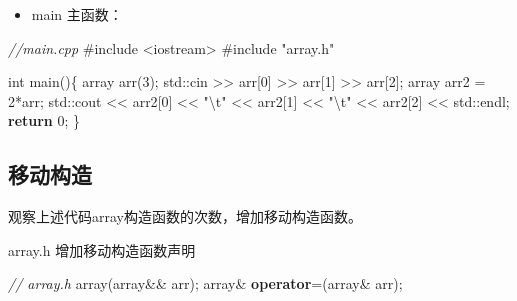 \documentclass[
]{article}
\newenvironment{Shaded}{}{}
\newcommand{\BuiltInTok}[1]{#1}
\newcommand{\CommentTok}[1]{\textcolor[rgb]{0.38,0.63,0.69}{\textit{#1}}}
\newcommand{\ControlFlowTok}[1]{\textcolor[rgb]{0.00,0.44,0.13}{\textbf{#1}}}
\newcommand{\DataTypeTok}[1]{\textcolor[rgb]{0.56,0.13,0.00}{#1}}
\newcommand{\DecValTok}[1]{\textcolor[rgb]{0.25,0.63,0.44}{#1}}
\newcommand{\ImportTok}[1]{#1}
\newcommand{\KeywordTok}[1]{\textcolor[rgb]{0.00,0.44,0.13}{\textbf{#1}}}
\newcommand{\NormalTok}[1]{#1}
\newcommand{\OperatorTok}[1]{\textcolor[rgb]{0.40,0.40,0.40}{#1}}
\newcommand{\PreprocessorTok}[1]{\textcolor[rgb]{0.74,0.48,0.00}{#1}}
\newcommand{\SpecialCharTok}[1]{\textcolor[rgb]{0.25,0.44,0.63}{#1}}
\newcommand{\StringTok}[1]{\textcolor[rgb]{0.25,0.44,0.63}{#1}}
\providecommand{\tightlist}{%
  \setlength{\itemsep}{0pt}\setlength{\parskip}{0pt}}
\begin{document}
\begin{itemize}
\tightlist
\item
  main 主函数：
\end{itemize}

\begin{Shaded}
\begin{Highlighting}[]
\CommentTok{//main.cpp}
\PreprocessorTok{\#include }\ImportTok{\textless{}iostream\textgreater{}}
\PreprocessorTok{\#include }\ImportTok{"array.h"}

\DataTypeTok{int}\NormalTok{ main}\OperatorTok{()\{}
\NormalTok{    array   arr}\OperatorTok{(}\DecValTok{3}\OperatorTok{);}
    \BuiltInTok{std::}\NormalTok{cin}\OperatorTok{ \textgreater{}\textgreater{}}\NormalTok{ arr}\OperatorTok{[}\DecValTok{0}\OperatorTok{]} \OperatorTok{\textgreater{}\textgreater{}}\NormalTok{ arr}\OperatorTok{[}\DecValTok{1}\OperatorTok{]} \OperatorTok{\textgreater{}\textgreater{}}\NormalTok{ arr}\OperatorTok{[}\DecValTok{2}\OperatorTok{];}
\NormalTok{    array   arr2 }\OperatorTok{=} \DecValTok{2}\OperatorTok{*}\NormalTok{arr}\OperatorTok{;}
    \BuiltInTok{std::}\NormalTok{cout}\OperatorTok{ \textless{}\textless{}}\NormalTok{ arr2}\OperatorTok{[}\DecValTok{0}\OperatorTok{]} \OperatorTok{\textless{}\textless{}} \StringTok{"}\SpecialCharTok{\textbackslash{}t}\StringTok{"} \OperatorTok{\textless{}\textless{}}\NormalTok{ arr2}\OperatorTok{[}\DecValTok{1}\OperatorTok{]} \OperatorTok{\textless{}\textless{}} \StringTok{"}\SpecialCharTok{\textbackslash{}t}\StringTok{"} \OperatorTok{\textless{}\textless{}}\NormalTok{ arr2}\OperatorTok{[}\DecValTok{2}\OperatorTok{]} \OperatorTok{\textless{}\textless{}} \BuiltInTok{std::}\NormalTok{endl}\OperatorTok{;}
    \ControlFlowTok{return} \DecValTok{0}\OperatorTok{;}
\OperatorTok{\}}
\end{Highlighting}
\end{Shaded}

\hypertarget{ux79fbux52a8ux6784ux9020}{%
\subsection{移动构造}\label{ux79fbux52a8ux6784ux9020}}

观察上述代码array构造函数的次数，增加移动构造函数。

array.h 增加移动构造函数声明

\begin{Shaded}
\begin{Highlighting}[]
\CommentTok{// array.h}
\NormalTok{array}\OperatorTok{(}\NormalTok{array}\OperatorTok{\&\&}\NormalTok{ arr}\OperatorTok{);}
\NormalTok{array}\OperatorTok{\&} \KeywordTok{operator}\OperatorTok{=(}\NormalTok{array}\OperatorTok{\&}\NormalTok{ arr}\OperatorTok{);}
\end{Highlighting}
\end{Shaded}
\end{document}
